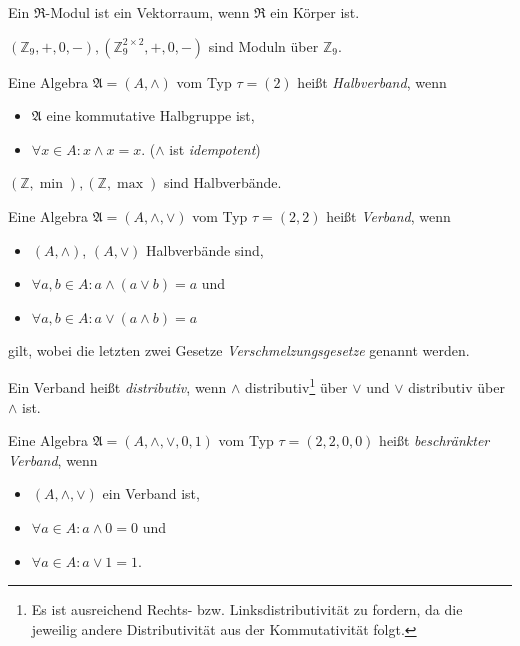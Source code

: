 \begin{remark}
    Ein $\mathfrak{R}$-Modul ist ein Vektorraum, wenn $\mathfrak{R}$ ein Körper ist.
\end{remark}

\begin{example}
    $(\mathbb{Z}_9, +, 0, -), (\mathbb{Z}_9^{2 \times 2}, +, 0, -)$ sind Moduln über $\mathbb{Z}_9$.
\end{example}

\begin{definition}
    Eine Algebra $\mathfrak{A} = (A, \wedge)$ vom Typ $\tau = (2)$ heißt \emph{Halbverband}, wenn
    \begin{itemize}[topsep=0pt, label={--}]
        \item $\mathfrak{A}$ eine kommutative Halbgruppe ist,
        \item $\forall x \in A: x \wedge x = x$. \tab ($\wedge$ ist \emph{idempotent})
    \end{itemize}
\end{definition}

\begin{remark}
    $(\mathbb{Z}, \min), (\mathbb{Z}, \max)$ sind Halbverbände.
\end{remark}

\begin{definition}
    Eine Algebra $\mathfrak{A} = (A, \wedge, \vee)$ vom Typ $\tau = (2, 2)$ heißt \emph{Verband}, wenn
    \begin{itemize}[topsep=0pt, label={--}]
        \item $(A, \wedge)$, $(A, \vee)$ Halbverbände sind, 
        \item $\forall a,b \in A: a \wedge (a \vee b) = a$ und
        \item $\forall a,b \in A: a \vee (a \wedge b) = a$
    \end{itemize}
    gilt, wobei die letzten zwei Gesetze \emph{Verschmelzungsgesetze} genannt werden.

    Ein Verband heißt \emph{distributiv}, wenn $\wedge$ distributiv\footnote{Es ist ausreichend Rechts- bzw. Linksdistributivität zu fordern, da die jeweilig andere Distributivität aus der Kommutativität folgt.} über $\vee$ und $\vee$ distributiv über $\wedge$ ist.

    Eine Algebra $\mathfrak{A} = (A, \wedge, \vee, 0, 1)$ vom Typ $\tau = (2,2,0,0)$ heißt \emph{beschränkter Verband}, wenn
    \begin{itemize}[topsep=0pt, label={--}]
        \item $(A, \wedge, \vee)$ ein Verband ist,
        \item $\forall a \in A: a \wedge 0 = 0$ und
        \item $\forall a \in A: a \vee 1 = 1$.
    \end{itemize}
\end{definition}

